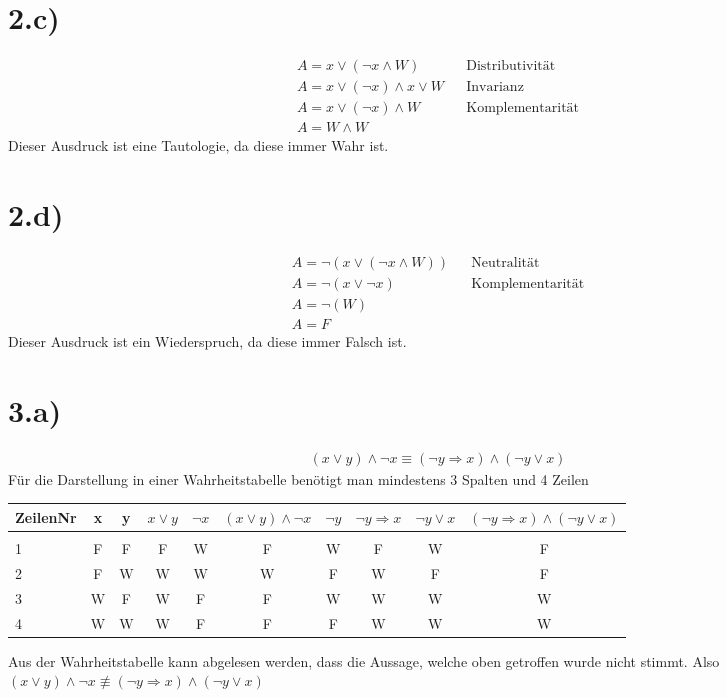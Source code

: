 \documentclass[10pt,ngerman]{scrartcl}
\begin{document}
\section{2.c)}
\setcounter{equation}{0}
\begin{align}
A =x \vee (\neg x \wedge W) && \text{Distributivität}\\
A =x \vee (\neg x) \wedge x \vee W && \text{Invarianz}\\
A =x \vee (\neg x) \wedge W && \text{Komplementarität}\\
A =W \wedge W
\end{align}
Dieser Ausdruck ist eine Tautologie, da diese immer Wahr ist.
\section{2.d)}
\setcounter{equation}{0}
\begin{align}
A =\neg (x \vee (\neg x \wedge W))&& \text{Neutralität}\\
A =\neg (x \vee \neg x)   && \text{Komplementarität}\\
A =\neg(W) \\
A = F
\end{align}
Dieser Ausdruck ist ein Wiederspruch, da diese immer Falsch ist.
\section{3.a)}
\setcounter{equation}{0}
\begin{align}
(x \vee y) \wedge \neg x \equiv (\neg y \Rightarrow x) \wedge (\neg y \vee x)
\end{align}
Für die Darstellung in einer Wahrheitstabelle benötigt man mindestens 3 Spalten und 4 Zeilen
\begin{table}[H]
\begin{center}
\begin{tabular}{l|c|c|c|c|c|c|c|c|c}
ZeilenNr&x&y&$x \vee y$ & $\neg x$ & $(x \vee y) \wedge \neg x $ & $\neg y$ & $\neg y \Rightarrow x$ & $\neg y \vee x$ & $(\neg y \Rightarrow x) \wedge (\neg y \vee x)$\\
\hline
&&&&&&&&&\\
1 & F & F & F & W & \color{blue}F\color{black} & W & F & W & \color{blue}F\color{black}\\
2 & F & W & W & W & \color{blue}W\color{black} & F & W & F & \color{blue}F\color{black}\\
3 & W & F & W & F & \color{blue}F\color{black} & W & W & W & \color{blue}W\color{black}\\
4 & W & W & W & F & \color{blue}F\color{black} & F & W & W & \color{blue}W\color{black}\\
\end{tabular}
\end{center}
\end{table}
\flushleft Aus der Wahrheitstabelle kann abgelesen werden, dass die Aussage, welche oben getroffen wurde nicht stimmt. Also $ (x \vee y) \wedge \neg x \not \equiv (\neg y \Rightarrow x) \wedge (\neg y \vee x) $
\end{document}
